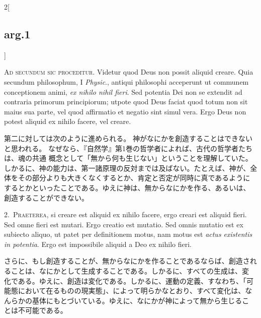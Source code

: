 \documentclass[paper=a4paper,fontsize=10pt,jafontsize=9pt,titlepage]{jlreq}
\begin{document}
\begin{paracol}{2}[\subsection{arg.1}]

{\huge A}{\scshape d secundum sic proceditur}. Videtur quod Deus non possit aliquid
 creare. Quia secundum philosophum, I {\itshape Physic}., antiqui philosophi
 acceperunt ut communem conceptionem animi, {\itshape ex nihilo nihil fieri}. Sed
 potentia Dei non se extendit ad contraria primorum principiorum; utpote
 quod Deus faciat quod totum non sit maius sua parte, vel quod
 affirmatio et negatio sint simul vera. Ergo Deus non potest aliquid ex
 nihilo facere, vel creare.

\switchcolumn

第二に対しては次のように進められる。
神がなにかを創造することはできないと思われる。
なぜなら、『自然学』第1巻の哲学者によれば、古代の哲学者たちは、魂の共通
 概念として「無から何も生じない」ということを理解していた。
しかるに、神の能力は、第一諸原理の反対までは及ばない。たとえば、神が、全
 体をその部分よりも大きくなくするとか、肯定と否定が同時に真であるように
 するとかといったことである。ゆえに神は、無からなにかを作る、あるいは、
 創造することができない。


2.~{\scshape Praeterea}, si creare est aliquid ex nihilo facere, ergo creari est
 aliquid fieri. Sed omne fieri est mutari. Ergo creatio est mutatio. Sed
 omnis mutatio est ex subiecto aliquo, ut patet per definitionem motus,
 nam motus est {\itshape actus existentis in potentia}. Ergo est impossibile
 aliquid a Deo ex nihilo fieri.

\switchcolumn

さらに、もし創造することが、無からなにかを作ることであるならば、創造され
 ることは、なにかとして生成することである。しかるに、すべての生成は、変
 化である。ゆえに、創造は変化である。しかるに、運動の定義、すなわち、「可
 能態において在るものの現実態」、によって明らかなとおり、すべて変化は、な
 んらかの基体にもとづいている。ゆえに、なにかが神によって無から生じるこ
 とは不可能である。



\end{paracol}
\end{document}

